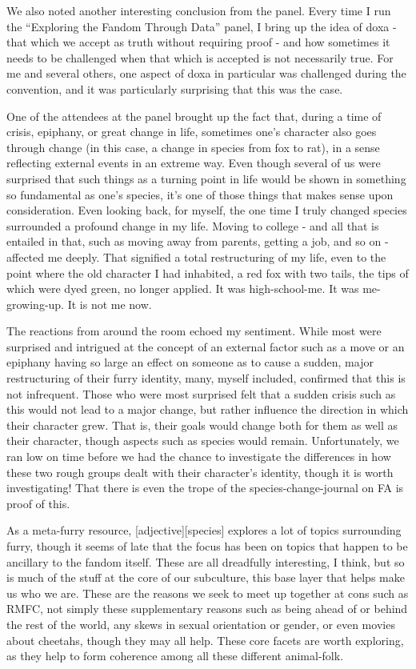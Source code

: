 We also noted another interesting conclusion from the panel. Every time I run the ``Exploring the Fandom Through Data'' panel, I bring up the idea of doxa - that which we accept as truth without requiring proof - and how sometimes it needs to be challenged when that which is accepted is not necessarily true. For me and several others, one aspect of doxa in particular was challenged during the convention, and it was particularly surprising that this was the case.

One of the attendees at the panel brought up the fact that, during a time of crisis, epiphany, or great change in life, sometimes one's character also goes through change (in this case, a change in species from fox to rat), in a sense reflecting external events in an extreme way. Even though several of us were surprised that such things as a turning point in life would be shown in something so fundamental as one's species, it's one of those things that makes sense upon consideration. Even looking back, for myself, the one time I truly changed species surrounded a profound change in my life. Moving to college - and all that is entailed in that, such as moving away from parents, getting a job, and so on - affected me deeply. That signified a total restructuring of my life, even to the point where the old character I had inhabited, a red fox with two tails, the tips of which were dyed green, no longer applied. It was high-school-me. It was me-growing-up. It is not me now.

The reactions from around the room echoed my sentiment. While most were surprised and intrigued at the concept of an external factor such as a move or an epiphany having so large an effect on someone as to cause a sudden, major restructuring of their furry identity, many, myself included, confirmed that this is not infrequent. Those who were most surprised felt that a sudden crisis such as this would not lead to a major change, but rather influence the direction in which their character grew. That is, their goals would change both for them as well as their character, though aspects such as species would remain. Unfortunately, we ran low on time before we had the chance to investigate the differences in how these two rough groups dealt with their character's identity, though it is worth investigating! That there is even the trope of the species-change-journal on FA is proof of this.

As a meta-furry resource, {[}adjective{]}{[}species{]} explores a lot of topics surrounding furry, though it seems of late that the focus has been on topics that happen to be ancillary to the fandom itself. These are all dreadfully interesting, I think, but so is much of the stuff at the core of our subculture, this base layer that helps make us who we are. These are the reasons we seek to meet up together at cons such as RMFC, not simply these supplementary reasons such as being ahead of or behind the rest of the world, any skews in sexual orientation or gender, or even movies about cheetahs, though they may all help. These core facets are worth exploring, as they help to form coherence among all these different animal-folk.

